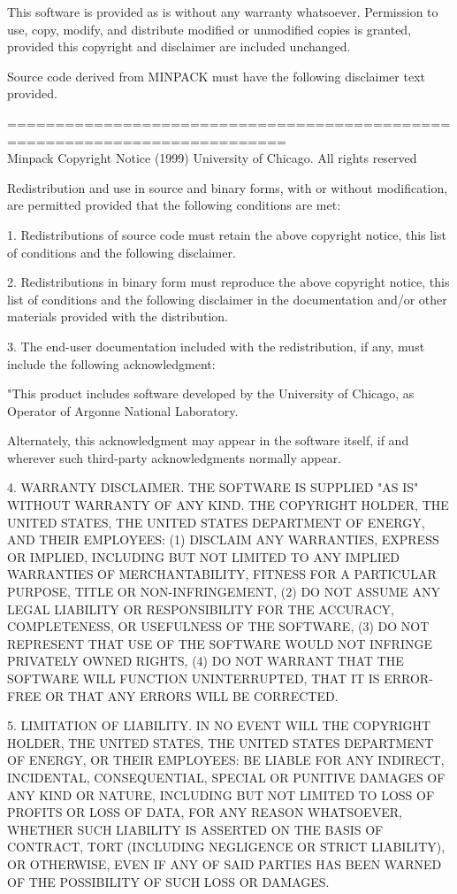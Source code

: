  This software is provided as is without any warranty whatsoever.
  Permission to use, copy, modify, and distribute modified or
  unmodified copies is granted, provided this copyright and disclaimer
  are included unchanged.


Source code derived from MINPACK must have the following disclaimer
text provided.

===========================================================================\\
Minpack Copyright Notice (1999) University of Chicago.  All rights reserved

Redistribution and use in source and binary forms, with or
without modification, are permitted provided that the
following conditions are met:

1. Redistributions of source code must retain the above
copyright notice, this list of conditions and the following
disclaimer.

2. Redistributions in binary form must reproduce the above
copyright notice, this list of conditions and the following
disclaimer in the documentation and/or other materials
provided with the distribution.

3. The end-user documentation included with the
redistribution, if any, must include the following
acknowledgment:

   "This product includes software developed by the
   University of Chicago, as Operator of Argonne National
   Laboratory.

Alternately, this acknowledgment may appear in the software
itself, if and wherever such third-party acknowledgments
normally appear.

4. WARRANTY DISCLAIMER. THE SOFTWARE IS SUPPLIED "AS IS"
WITHOUT WARRANTY OF ANY KIND. THE COPYRIGHT HOLDER, THE
UNITED STATES, THE UNITED STATES DEPARTMENT OF ENERGY, AND
THEIR EMPLOYEES: (1) DISCLAIM ANY WARRANTIES, EXPRESS OR
IMPLIED, INCLUDING BUT NOT LIMITED TO ANY IMPLIED WARRANTIES
OF MERCHANTABILITY, FITNESS FOR A PARTICULAR PURPOSE, TITLE
OR NON-INFRINGEMENT, (2) DO NOT ASSUME ANY LEGAL LIABILITY
OR RESPONSIBILITY FOR THE ACCURACY, COMPLETENESS, OR
USEFULNESS OF THE SOFTWARE, (3) DO NOT REPRESENT THAT USE OF
THE SOFTWARE WOULD NOT INFRINGE PRIVATELY OWNED RIGHTS, (4)
DO NOT WARRANT THAT THE SOFTWARE WILL FUNCTION
UNINTERRUPTED, THAT IT IS ERROR-FREE OR THAT ANY ERRORS WILL
BE CORRECTED.

5. LIMITATION OF LIABILITY. IN NO EVENT WILL THE COPYRIGHT
HOLDER, THE UNITED STATES, THE UNITED STATES DEPARTMENT OF
ENERGY, OR THEIR EMPLOYEES: BE LIABLE FOR ANY INDIRECT,
INCIDENTAL, CONSEQUENTIAL, SPECIAL OR PUNITIVE DAMAGES OF
ANY KIND OR NATURE, INCLUDING BUT NOT LIMITED TO LOSS OF
PROFITS OR LOSS OF DATA, FOR ANY REASON WHATSOEVER, WHETHER
SUCH LIABILITY IS ASSERTED ON THE BASIS OF CONTRACT, TORT
(INCLUDING NEGLIGENCE OR STRICT LIABILITY), OR OTHERWISE,
EVEN IF ANY OF SAID PARTIES HAS BEEN WARNED OF THE
POSSIBILITY OF SUCH LOSS OR DAMAGES.

